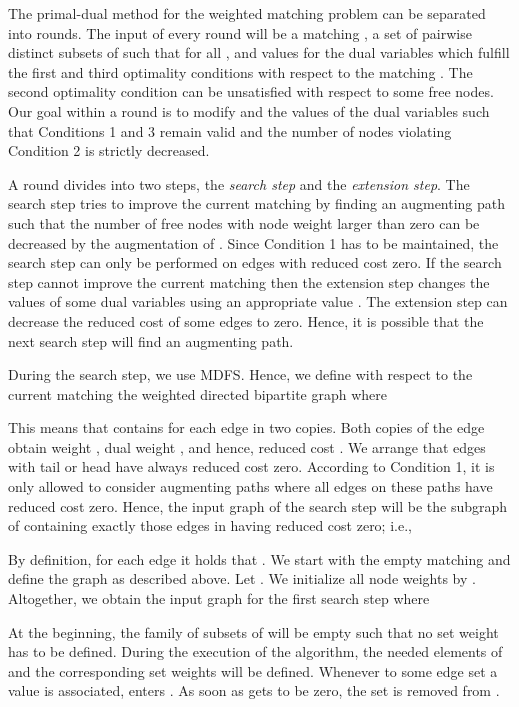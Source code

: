 \documentclass[12pt,twoside,a4paper]{article}
\begin{document}
\medskip
The primal-dual method for the weighted matching problem can be separated into 
rounds. The input of every round will be a matching , a set  of pairwise 
distinct subsets of  such that  for all , and values 
for the dual variables which fulfill the first and third optimality conditions with 
respect to the matching . The second optimality condition can be unsatisfied with 
respect to some free nodes. Our goal within a round is to modify  and the 
values of the dual variables such that Conditions 1 and 3 remain valid
and the number of nodes violating Condition 2 is strictly decreased.

A round divides into two steps, the {\em search step\/} and the
{\em extension step}. The search step tries to improve
the current matching by finding an augmenting path  such that the number
of free nodes with node weight larger than zero can be decreased by the 
augmentation of . Since Condition 1 has to be maintained, the search step
can only be performed on edges with reduced cost zero. If the search step cannot
improve the current matching then the extension step
changes the values of some dual variables using an appropriate value . 
The extension step can decrease the reduced cost of some edges to zero. Hence, 
it is possible that the next search step will find an augmenting path.

During the search step, we use MDFS. Hence, we define with respect to the current 
matching  the weighted directed bipartite graph  where

This means that  contains for each edge in  two copies.
Both copies of the edge  obtain weight , dual weight , and hence, 
reduced cost .
We arrange that edges with tail  or head  have always reduced cost zero. 
According to Condition 1,
it is only allowed to consider augmenting paths where all edges on these
paths have reduced cost zero. Hence, the input graph  of the
search step will be the subgraph of  containing exactly those edges in  
having reduced cost zero; i.e., 

By definition, for each edge  it holds that 
. We start with the empty matching  
and define the graph  as described above.
Let . We initialize all node weights 
by . Altogether, we obtain the input graph 
 for the first search step where

At the beginning, the family  of subsets of  will be empty such 
that no set weight has to be defined. 
During the execution of the algorithm, the needed elements of  and the corresponding 
set weights will be defined. 
Whenever to some edge set  a value
 is associated,  enters . 
As soon as  gets to be zero, the set  is removed from .
\end{document}
